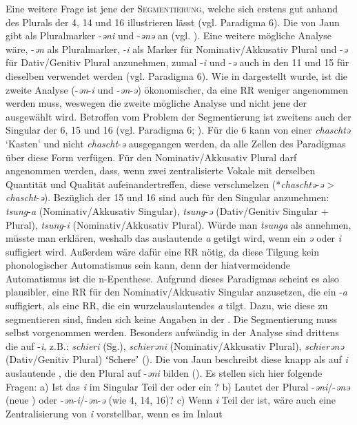 Eine weitere Frage ist jene der \textsc{Segmentierung}, welche sich erstens gut anhand des Plurals der  4, 14 und 16 illustrieren lässt (vgl. Paradigma 6). Die  von Jaun gibt als Pluralmarker -\textit{əni} und -\textit{ənə} an (vgl. \citealt[§206, §211 und §212.2]{Stucki2011}). Eine weitere mögliche Analyse wäre, -\textit{ən} als Pluralmarker, -\textit{i} als Marker für Nominativ/Akkusativ Plural und -\textit{ə} für Dativ/Genitiv Plural anzunehmen, zumal -\textit{i} und -\textit{ə} auch in den  11 und 15 für dieselben  verwendet werden (vgl. Paradigma 6). Wie in  dargestellt wurde, ist die zweite Analyse (-\textit{ən}-\textit{i} und -\textit{ən}-\textit{ə}) ökonomischer, da eine RR weniger angenommen werden muss, weswegen die zweite mögliche Analyse und nicht jene der  ausgewählt wird. Betroffen vom Problem der Segmentierung ist zweitens auch der Singular der  6, 15 und 16 (vgl. Paradigma 6; \citealt[§203.2.b.β und §212]{Stucki2011}). Für die  6 kann von einer  \textit{chaschtə} ‘Kasten’ und nicht \textit{chascht}-\textit{ə} ausgegangen werden, da alle Zellen des Paradigmas über diese Form verfügen. Für den Nominativ/Akkusativ Plural darf angenommen werden, dass, wenn zwei zentralisierte Vokale mit derselben Quantität und Qualität aufeinandertreffen, diese verschmelzen (*\textit{chaschtə}-\textit{ə} > \textit{chascht}-\textit{ə}). Bezüglich der  15 und 16 sind auch für den Singular  anzunehmen: \textit{tsung}-\textit{a} (Nominativ/Akkusativ Singular), \textit{tsung}-\textit{ə} (Dativ/Genitiv Singular + Plural), \textit{tsung}-\textit{i} (Nominativ/Akkusativ Plural). Würde man \textit{tsunga} als  annehmen, müsste man erklären, weshalb das auslautende \textit{a} getilgt wird, wenn ein \textit{ə} oder \textit{i} suffigiert wird. Außerdem wäre dafür eine RR nötig, da diese Tilgung kein phonologischer Automatismus sein kann, denn der hiatvermeidende Automatismus ist die n-Epenthese. Aufgrund dieses Paradigmas scheint es also plausibler, eine RR für den Nominativ/Akkusativ Singular anzusetzen, die ein -\textit{a} suffigiert, als eine RR, die ein wurzelauslautendes \textit{a} tilgt. Dazu, wie diese  zu segmentieren sind, finden sich keine Angaben in der . Die Segmentierung muss selbst vorgenommen werden. Besonders aufwändig in der Analyse sind drittens die  auf -\textit{i}, z.B.: \textit{schieri} (Sg.), \textit{schierəni} (Nominativ/Akkusativ Plural), \textit{schierənə} (Dativ/Genitiv Plural) ʻSchereʼ (\citealt[§206 und §211]{Stucki2011}). Die  von Jaun beschreibt diese knapp als auf \textit{i} auslautende , die den Plural auf -\textit{əni} bilden (\citealt[§206 und §211]{Stucki2011}). Es stellen sich hier folgende Fragen: a) Ist das \textit{i} im Singular Teil der  oder ein ? b) Lautet der Plural -\textit{əni}/-\textit{ənə} (neue ) oder -\textit{ən}-\textit{i}/-\textit{ən}-\textit{ə} (wie  4, 14, 16)? c) Wenn \textit{i} Teil der  ist, wäre auch eine Zentralisierung von \textit{i} vorstellbar, wenn es im Inlaut 